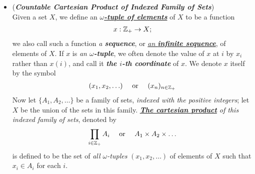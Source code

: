 \documentclass[11pt]{article}
\begin{document}
\begin{itemize}
\item \begin{definition}  (\emph{\textbf{Countable Cartesian Product of Indexed Family of Sets}})\\
Given a set $X$, we define an \underline{\emph{\textbf{$\omega$-tuple of elements}}} of $X$ to be a function
\begin{align*}
x: {\mathbb Z}_{+} \rightarrow X;
\end{align*}
we also call such a function \emph{a \textbf{sequence}}, or \underline{\emph{an \textbf{infinite sequence}}}, of elements of $X$. If
$x$ is \emph{an \textbf{$\omega$-tuple}}, we often denote the value of $x$ at $i$ by $x_i$ rather than $x(i)$, and call it \emph{\textbf{the $i$-th coordinate}} of $x$. We denote $x$ itself by the symbol
\begin{align*}
(x_1, x_2, \ldots ) \quad \text{ or } \quad (x_n)_{n \in {\mathbb Z}_{+}}
\end{align*}
Now let $\{A_1, A_2, \ldots \}$  be a family of sets, \emph{indexed with the positive integers}; let $X$ be the union of the sets in this family. \emph{\textbf{\underline{The cartesian product}} of this indexed family of sets}, denoted by
\begin{align*}
\prod_{i \in {\mathbb Z}_{+}} A_i \quad \text{ or } \quad A_1 \times A_2 \times \ldots 
\end{align*}
is defined to be the set of \emph{all $\omega$-tuples} $(x_1, x_2, \ldots ) $ of elements of $X$ such that $x_i \in A_i$ for each $i$.
\end{definition}
\end{itemize}
\end{document}

